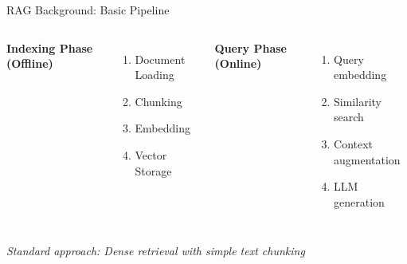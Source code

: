 \documentclass[aspectratio=169]{beamer}
\begin{document}
\begin{frame}{RAG Background: Basic Pipeline}
\begin{columns}[T]
\textbf{Indexing Phase (Offline)}
\begin{enumerate}
    \item Document Loading
    \item Chunking
    \item Embedding
    \item Vector Storage
\end{enumerate}

\textbf{Query Phase (Online)}
\begin{enumerate}
    \item Query embedding
    \item Similarity search
    \item Context augmentation
    \item LLM generation
\end{enumerate}
\end{columns}

\vspace{0.5cm}
\begin{center}
\textit{Standard approach: Dense retrieval with simple text chunking}
\end{center}
\end{frame}
\end{document}
